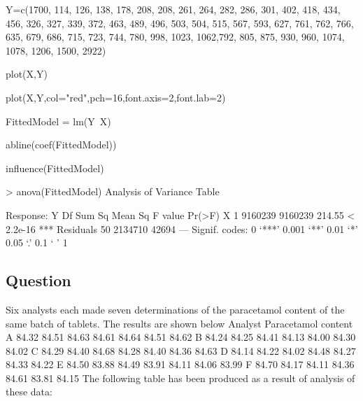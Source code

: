 Y=c(1700, 114, 126, 138, 178, 208, 208, 261, 264, 282, 286, 301, 
402, 418, 434, 456, 326, 327, 339, 372,  463, 489, 496, 503, 504, 
515, 567, 593, 627, 761, 762, 766,  635, 679, 686, 715, 723, 744, 
780, 998, 1023, 1062,792, 805, 875, 930, 960,  1074, 1078, 1206, 
1500, 2922)

plot(X,Y)

plot(X,Y,col="red",pch=16,font.axis=2,font.lab=2)

FittedModel = lm(Y~X)

abline(coef(FittedModel))

influence(FittedModel)


> anova(FittedModel)
Analysis of Variance Table

Response: Y
          	Df  	Sum Sq 	Mean Sq 	F value    	Pr(>F)    
X         	 1 	9160239 	9160239 	 214.55 	< 2.2e-16 ***
Residuals 	50 	2134710   	42694                      
---
Signif. codes:  0 ‘***’ 0.001 ‘**’ 0.01 ‘*’ 0.05 ‘.’ 0.1 ‘ ’ 1 


\subsection{Question}
Six analysts each made seven determinations of the paracetamol content of the same batch of tablets.
The results are shown below
Analyst Paracetamol content
A 84.32 84.51 84.63 84.61 84.64 84.51 84.62
B 84.24 84.25 84.41 84.13 84.00 84.30 84.02
C 84.29 84.40 84.68 84.28 84.40 84.36 84.63
D 84.14 84.22 84.02 84.48 84.27 84.33 84.22
E 84.50 83.88 84.49 83.91 84.11 84.06 83.99
F 84.70 84.17 84.11 84.36 84.61 83.81 84.15
The following table has been produced as a result of analysis of these data:



